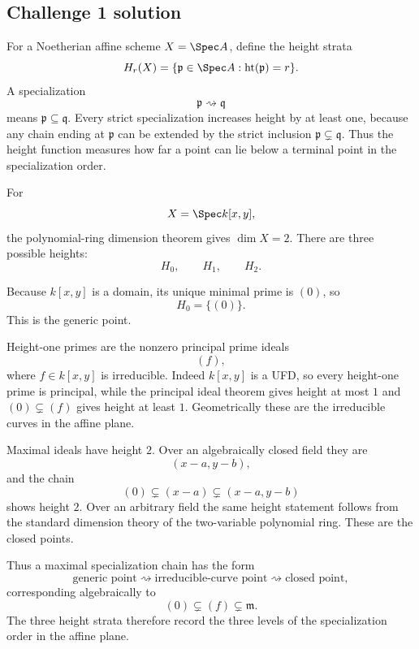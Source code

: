 
\subsection*{Challenge 1 solution}
\begin{solution}
For a Noetherian affine scheme \(X=\Spec A\), define the height strata
\[
H_r(X)=\{\mathfrak p\in\Spec A:\operatorname{ht}(\mathfrak p)=r\}.
\]
A specialization
\[
\mathfrak p\rightsquigarrow\mathfrak q
\]
means \(\mathfrak p\subseteq\mathfrak q\).  Every strict specialization increases height by at
least one, because any chain ending at \(\mathfrak p\) can be extended by the strict inclusion
\(\mathfrak p\subsetneq\mathfrak q\).  Thus the height function measures how far a point can lie
below a terminal point in the specialization order.

For
\[
X=\Spec k[x,y],
\]
the polynomial-ring dimension theorem gives \(\dim X=2\).  There are three possible heights:
\[
H_0,\qquad H_1,\qquad H_2.
\]

Because \(k[x,y]\) is a domain, its unique minimal prime is \((0)\), so
\[
H_0=\{(0)\}.
\]
This is the generic point.

Height-one primes are the nonzero principal prime ideals
\[
(f),
\]
where \(f\in k[x,y]\) is irreducible.  Indeed \(k[x,y]\) is a UFD, so every height-one prime is
principal, while the principal ideal theorem gives height at most \(1\) and
\((0)\subsetneq(f)\) gives height at least \(1\).  Geometrically these are the irreducible curves
in the affine plane.

Maximal ideals have height \(2\).  Over an algebraically closed field they are
\[
(x-a,y-b),
\]
and the chain
\[
(0)\subsetneq(x-a)\subsetneq(x-a,y-b)
\]
shows height \(2\).  Over an arbitrary field the same height statement follows from the standard
dimension theory of the two-variable polynomial ring.  These are the closed points.

Thus a maximal specialization chain has the form
\[
\text{generic point}
\rightsquigarrow
\text{irreducible-curve point}
\rightsquigarrow
\text{closed point},
\]
corresponding algebraically to
\[
(0)\subsetneq(f)\subsetneq\mathfrak m.
\]
The three height strata therefore record the three levels of the specialization order in the
affine plane.
\end{solution}

